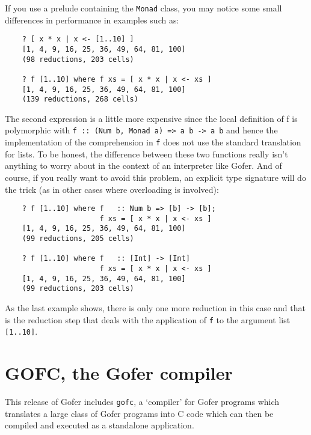 If you use a prelude containing the \verb"Monad" class, you may notice some
small differences in performance in examples such as:
\begin{verbatim}
    ? [ x * x | x <- [1..10] ]
    [1, 4, 9, 16, 25, 36, 49, 64, 81, 100]
    (98 reductions, 203 cells)

    ? f [1..10] where f xs = [ x * x | x <- xs ]
    [1, 4, 9, 16, 25, 36, 49, 64, 81, 100]
    (139 reductions, 268 cells)
\end{verbatim}
The second expression is a little more expensive since the local
definition of f is polymorphic with \verb"f :: (Num b, Monad a) => a b -> a b"
and hence the implementation of the comprehension in \verb"f" does not use the
standard translation for lists.  To be honest, the difference between
these two functions really isn't anything to worry about in the context
of an interpreter like Gofer.  And of course, if you really want to
avoid this problem, an explicit type signature will do the trick (as in
other cases where overloading is involved):
\begin{verbatim}
    ? f [1..10] where f   :: Num b => [b] -> [b];
                      f xs = [ x * x | x <- xs ]
    [1, 4, 9, 16, 25, 36, 49, 64, 81, 100]
    (99 reductions, 205 cells)

    ? f [1..10] where f   :: [Int] -> [Int]
                      f xs = [ x * x | x <- xs ]      
    [1, 4, 9, 16, 25, 36, 49, 64, 81, 100]
    (99 reductions, 203 cells)
\end{verbatim}
As the last example shows, there is only one more reduction in this
case and that is the reduction step that deals with the application of
\verb"f" to the argument list \verb"[1..10]".


\section{GOFC, the Gofer compiler}


This release of Gofer includes \verb"gofc", a `compiler' for Gofer programs
which translates a large class of Gofer programs into C code which can
then be compiled and executed as a standalone application.

